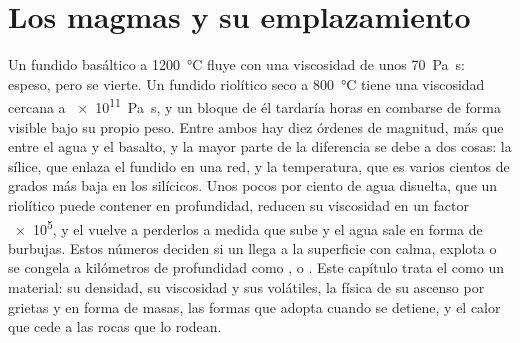 \chapter{Los magmas y su emplazamiento}\label{ch:b2:magma-emplacement}

Un fundido basáltico a \qty{1200}{\celsius} fluye con una viscosidad de unos
\qty{70}{Pa.s}: espeso, pero se vierte. Un fundido riolítico seco a \qty{800}{\celsius}
tiene una viscosidad cercana a \qty{e11}{Pa.s}, y un bloque de él tardaría horas en combarse
de forma visible bajo su propio peso. Entre ambos hay diez órdenes de magnitud, más
que entre el agua y el basalto, y la mayor parte de la diferencia se debe a dos
cosas: la sílice, que enlaza el fundido en una red, y la temperatura,
que es varios cientos de grados más baja en los  silícicos. Unos pocos por ciento de
agua disuelta, que un  riolítico puede contener en profundidad, reducen su viscosidad
en un factor \num{e5}, y el  vuelve a perderlos a medida que sube y el
agua sale en forma de burbujas. Estos números deciden si un  llega a la
superficie con calma, explota o se congela a kilómetros de profundidad como ,  o
. Este capítulo trata el  como un material: su densidad, su viscosidad y sus
volátiles, la física de su ascenso por grietas y en forma de masas, las formas que
adopta cuando se detiene, y el calor que cede a las rocas que lo rodean.

